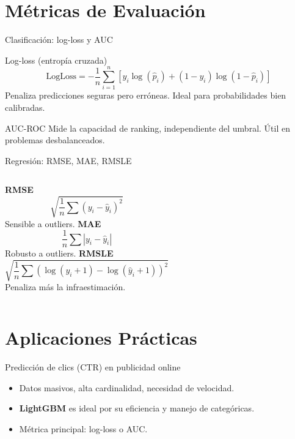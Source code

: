 \documentclass[aspectratio=169, 10pt, xcolor=table]{beamer}
\begin{document}
\section{Métricas de Evaluación}

\begin{frame}{Clasificación: log-loss y AUC}
    \begin{block}{Log-loss (entropía cruzada)}
        \[
        \text{LogLoss} = -\frac{1}{n}\sum_{i=1}^n \left[ y_i \log(\hat{p}_i) + (1-y_i)\log(1-\hat{p}_i) \right]
        \]
        Penaliza predicciones seguras pero erróneas. Ideal para probabilidades bien calibradas.
    \end{block}
    \begin{block}{AUC-ROC}
        Mide la capacidad de ranking, independiente del umbral. Útil en problemas desbalanceados.
    \end{block}
\end{frame}

\begin{frame}{Regresión: RMSE, MAE, RMSLE}
    \begin{columns}[t]
        \textbf{RMSE}
        \[
        \sqrt{\frac{1}{n}\sum (y_i-\hat{y}_i)^2}
        \]
        Sensible a outliers.
        \textbf{MAE}
        \[
        \frac{1}{n}\sum |y_i-\hat{y}_i|
        \]
        Robusto a outliers.
        \textbf{RMSLE}
        \[
        \sqrt{\frac{1}{n}\sum (\log(y_i+1)-\log(\hat{y}_i+1))^2}
        \]
        Penaliza más la infraestimación.
    \end{columns}
\end{frame}

\section{Aplicaciones Prácticas}

\begin{frame}{Predicción de clics (CTR) en publicidad online}
    \begin{itemize}
        \item Datos masivos, alta cardinalidad, necesidad de velocidad.
        \item \textbf{LightGBM} es ideal por su eficiencia y manejo de categóricas.
        \item Métrica principal: log-loss o AUC.
    \end{itemize}
\end{frame}
\end{document}
